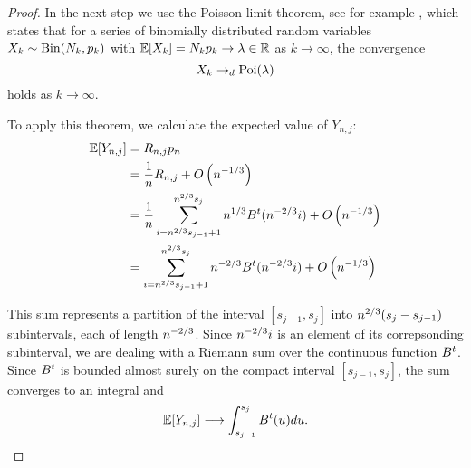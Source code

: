 \begin{proof}
In the next step we use the Poisson limit theorem, see for example \cite[Theorem 3.7, p.79]{Klenke2013},
which states that for a series of binomially distributed random variables $X_k \sim \operatorname*{Bin}(N_k, p_k)$
with $\mathbb{E}[X_k] = N_k p_k \rightarrow \lambda \in \mathbb{R}$ as $k \rightarrow \infty$,
the convergence 
\begin{equation}
	X_k \rightarrow_d \operatorname*{Poi}(\lambda)
\end{equation}
holds as $k \rightarrow \infty$.

To apply this theorem, we calculate the expected value of $Y_{n,j}$:
\begin{align*}
\mathbb{E}[Y_{n,j}] 
&= R_{n,j} p_n \\
&= \frac{1}{n} R_{n,j} + O\left(n^{-1 / 3}\right)\\
&= \frac{1}{n} \sum_{i=n^{2 / 3}s_{j-1}+1}^{n^{2 / 3}s_j}n^{1 / 3}B^t(n^{-2 / 3}i) + O\left(n^{-1 / 3}\right)\\
&= \sum_{i=n^{2 / 3}s_{j-1}+1}^{n^{2 / 3}s_j}n^{-2 / 3}B^t(n^{-2 / 3}i) + O\left(n^{-1 / 3}\right)
\end{align*}

This sum represents a partition of the interval $[s_{j-1}, s_j]$ into $n^{2 / 3}(s_j - s_{j-1})$ subintervals, each of length $n^{-2 / 3}$.
Since $n^{-2 / 3}i$ is an element of its correpsonding subinterval, 
we are dealing with a Riemann sum over the continuous function $B^t$.
Since $B^t$ is bounded almost surely on the compact interval $[s_{j-1}, s_j]$,
the sum converges to an integral and
\begin{equation}
\mathbb{E}[Y_{n,j}] \longrightarrow \int_{s_{j-1}}^{s_j} B^t(u)du.
\end{equation}


\end{proof}
